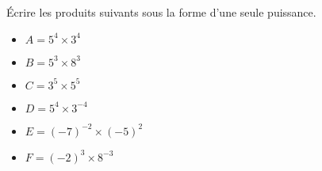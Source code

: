 \begin{exercice*}    
    Écrire les produits suivants sous la forme d'une seule puissance.
    \begin{multicols}{2}
        \begin{itemize}
            \item[] $A=5^4\times 3^4$
            \item[] $B=5^3\times 8^3$
            \item[] $C=3^5\times 5^5$
            \item[] $D=5^4\times 3^{-4}$
            \item[] $E=(-7)^{-2}\times (-5)^2$
            \item[] $F=(-2)^3\times 8^{-3}$
        \end{itemize}
    \end{multicols}
    
\end{exercice*}
